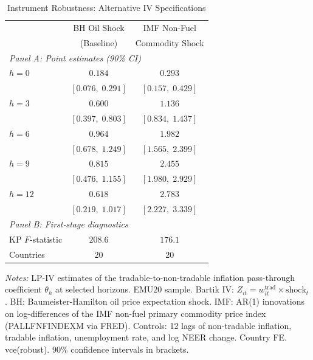 \begin{table}[htbp]
\centering
\begin{threeparttable}
\caption{Instrument Robustness: Alternative IV Specifications}
\label{tab:rob_instruments}
{\small
\begin{tabular}{lcc}
\toprule
 & BH Oil Shock & IMF Non-Fuel \\
 & (Baseline) & Commodity Shock \\
\midrule
\multicolumn{3}{l}{\textit{Panel A: Point estimates (90\% CI)}} \\[4pt]
$h=0$ & $0.184$ & $0.293$ \\
      & \footnotesize{$[0.076,\;0.291]$} & \footnotesize{$[0.157,\;0.429]$} \\[2pt]
$h=3$ & $0.600$ & $1.136$ \\
      & \footnotesize{$[0.397,\;0.803]$} & \footnotesize{$[0.834,\;1.437]$} \\[2pt]
$h=6$ & $0.964$ & $1.982$ \\
      & \footnotesize{$[0.678,\;1.249]$} & \footnotesize{$[1.565,\;2.399]$} \\[2pt]
$h=9$ & $0.815$ & $2.455$ \\
      & \footnotesize{$[0.476,\;1.155]$} & \footnotesize{$[1.980,\;2.929]$} \\[2pt]
$h=12$ & $0.618$ & $2.783$ \\
      & \footnotesize{$[0.219,\;1.017]$} & \footnotesize{$[2.227,\;3.339]$} \\[2pt]
\midrule
\multicolumn{3}{l}{\textit{Panel B: First-stage diagnostics}} \\[4pt]
KP $F$-statistic & $208.6$ & $176.1$ \\
Countries & 20 & 20 \\
\bottomrule
\end{tabular}
}
\begin{tablenotes}[flushleft]
\footnotesize
\item \textit{Notes:} LP-IV estimates of the tradable-to-non-tradable
inflation pass-through coefficient $\theta_h$ at selected horizons.
EMU20 sample. Bartik IV: $Z_{it} = w^{\text{trad}}_{it} \times \text{shock}_t$.
BH: Baumeister-Hamilton oil price expectation shock.
IMF: AR(1) innovations on log-differences of the IMF non-fuel primary
commodity price index (PALLFNFINDEXM via FRED).
Controls: 12 lags of non-tradable inflation, tradable inflation,
unemployment rate, and log NEER change. Country FE. vce(robust).
90\% confidence intervals in brackets.

\end{tablenotes}
\end{threeparttable}
\end{table}
